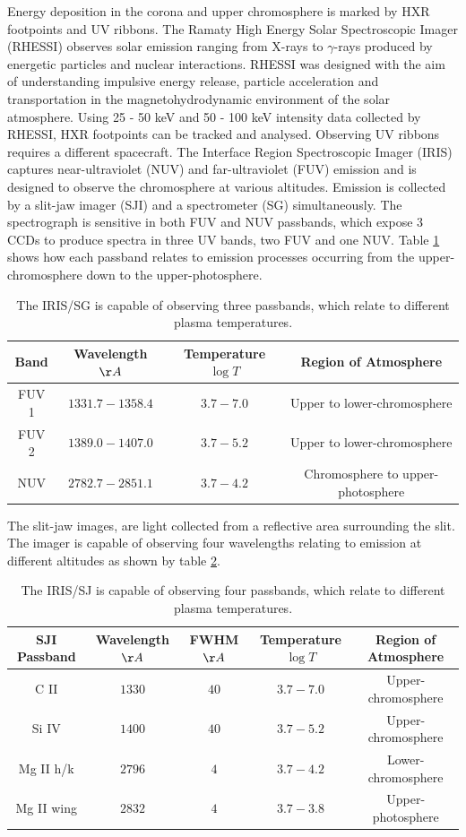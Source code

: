 Energy deposition in the corona and upper chromosphere is marked by HXR footpoints and UV ribbons. The Ramaty High Energy Solar Spectroscopic Imager (RHESSI) observes solar emission ranging from X-rays to $\gamma$-rays produced by energetic particles and nuclear interactions. RHESSI was designed with the aim of understanding impulsive energy release, particle acceleration and transportation in the magnetohydrodynamic environment of the solar atmosphere. Using 25 - 50 keV and 50 - 100 keV intensity data collected by RHESSI, HXR footpoints can be tracked and analysed. Observing UV ribbons requires a different spacecraft. The Interface Region Spectroscopic Imager (IRIS) captures near-ultraviolet (NUV) and far-ultraviolet (FUV) emission and is designed to observe the chromosphere at various altitudes. Emission is collected by a slit-jaw imager (SJI) and a spectrometer (SG) simultaneously. The spectrograph is sensitive in both FUV and NUV passbands, which expose 3 CCDs to produce spectra in three UV bands, two FUV and one NUV. Table \ref{iris-sg} shows how each passband relates to emission processes occurring from the upper-chromosphere down to the upper-photosphere. 

\begin{table}
\centering
\begin{tabular}{|c|c|c|c|}
Band & Wavelength $\AA$ & Temperature $\log{T}$ & Region of Atmosphere\\ 
\hline
FUV 1 & $1331.7 - 1358.4$ & $3.7 - 7.0$ & Upper to lower-chromosphere\\ 
FUV 2 & $1389.0 - 1407.0$ & $3.7 - 5.2$ & Upper to lower-chromosphere\\ 
NUV & $2782.7 - 2851.1$ & $3.7 - 4.2$ & Chromosphere to upper-photosphere\\ 
\end{tabular}
\caption{The IRIS/SG is capable of observing three passbands, which relate to different plasma temperatures.}\label{iris-sg}
\end{table}

The slit-jaw images, are light collected from a reflective area surrounding the slit. The imager is capable of observing four wavelengths relating to emission at different altitudes as shown by table \ref{iris-sj}. 

\begin{table}
\centering
\begin{tabular}{|c|c|c|c|c|}
SJI Passband & Wavelength $\AA$ & FWHM $\AA$ & Temperature $\log{T}$ & Region of Atmosphere\\ 
\hline
C II  & $1330$ & $40$ & $3.7 - 7.0$ & Upper-chromosphere\\ 
Si IV  & $1400$ & $40$ & $3.7 - 5.2$ & Upper-chromosphere\\ 
Mg II h/k & $2796$ & $4$ & $3.7 - 4.2$ & Lower-chromosphere\\ 
Mg II wing & $2832$ & $4$ & $3.7 - 3.8$ & Upper-photosphere\\   
\end{tabular}
\caption{The IRIS/SJ is capable of observing four passbands, which relate to different plasma temperatures.}\label{iris-sj}
\end{table}  

